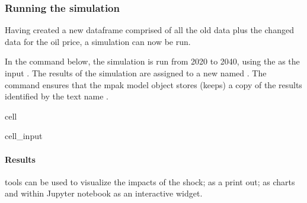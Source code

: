 \documentclass[letterpaper,10pt,english]{jupyterBook}
\begin{document}
\subsubsection{Running the simulation}
\label{\detokenize{content/06_WBModels/ScenarioAnalysis:running-the-simulation}}
\sphinxAtStartPar
Having created a new dataframe comprised of all the old data plus the changed data for the oil price, a simulation can now be run.

\sphinxAtStartPar
In the command below, the simulation is run from 2020 to 2040, using the  as the input .  The results of the simulation are assigned to a new   named .  The  command ensures that the mpak model object stores (keeps) a copy of the results identified by the text name .

\begin{sphinxuseclass}{cell}\begin{sphinxVerbatimInput}

\begin{sphinxuseclass}{cell_input}
\begin{sphinxVerbatim}[commandchars=\\\{\}]
   
\end{sphinxVerbatim}

\end{sphinxuseclass}\end{sphinxVerbatimInput}

\end{sphinxuseclass}

\paragraph{Results}
\label{\detokenize{content/06_WBModels/ScenarioAnalysis:results}}
\sphinxAtStartPar
{} tools can be used to visualize the impacts of the shock; as a print out; as charts and within Jupyter notebook as an interactive widget.
\end{document}
